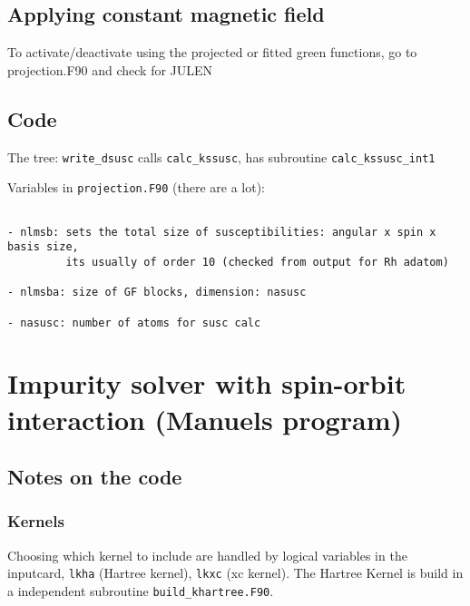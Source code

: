 \documentclass[a4paper,10pt,fullpage]{report}
\begin{document}
\subsection{Applying constant magnetic field}



To activate/deactivate using the projected or fitted green functions, go to projection.F90
and check for JULEN


\subsection{Code}


The tree: \verb|write_dsusc| calls \verb|calc_kssusc|, has subroutine \verb|calc_kssusc_int1|


Variables in \verb|projection.F90| (there are a lot):

\begin{verbatim}

- nlmsb: sets the total size of susceptibilities: angular x spin x basis size,
         its usually of order 10 (checked from output for Rh adatom)

- nlmsba: size of GF blocks, dimension: nasusc

- nasusc: number of atoms for susc calc

\end{verbatim}




\newpage

\section{Impurity solver with spin-orbit interaction (Manuels program)}
\label{sec:SOC}

\subsection{Notes on the code}

\subsubsection{Kernels}

Choosing which kernel to include are handled by logical variables 
in the inputcard, \verb|lkha| (Hartree kernel),   \verb|lkxc| (xc kernel).
The Hartree Kernel is build in a independent subroutine  \verb|build_khartree.F90|.
\end{document}
